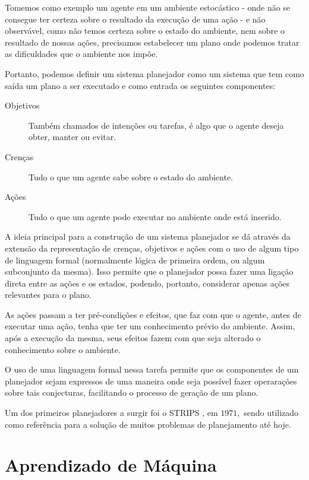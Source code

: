 Tomemos como exemplo um agente em um ambiente estocástico - onde não se consegue
ter certeza sobre o resultado da execução de uma ação - e não observável, como
não temos certeza sobre o estado do ambiente, nem sobre o resultado de nossas
ações, precisamos estabelecer um plano onde podemos tratar as dificuldades que
o ambiente nos impõe.

Portanto, podemos definir um sistema planejador como um sistema que tem como
saída um plano a ser executado e como entrada os seguintes componentes:

\begin{description}
    \item [Objetivos]
        Também chamados de intenções ou tarefas, é algo que o agente deseja
        obter, manter ou evitar.
    \item [Crenças]
        Tudo o que um agente sabe sobre o estado do ambiente.
    \item [Ações]
        Tudo o que um agente pode executar no ambiente onde está inserido.
\end{description}\cite{Woolridge:2001:IMS:559667}

A ideia principal para a construção de um sistema planejador se dá através da
extensão da representação de crenças, objetivos e ações com o uso de algum tipo
de linguagem formal (normalmente lógica de primeira ordem, ou algum subconjunto
da mesma). Isso permite que o planejador possa fazer uma ligação direta entre
as ações e os estados, podendo, portanto, considerar apenas ações relevantes
para o plano.
\cite{Russell:1995:AIM:193191}

As ações passam a ter pré-condições e efeitos, que faz com que o agente, antes
de executar uma ação, tenha que ter um conhecimento prévio do ambiente. Assim,
após a execução da mesma, seus efeitos fazem com que seja alterado o
conhecimento sobre o ambiente.

O uso de uma linguagem formal nessa tarefa permite que os componentes de um
planejador sejam expressos de uma maneira onde seja possível fazer operarações
sobre tais conjecturas, facilitando o processo de geração de um plano.

Um dos primeiros planejadores a surgir foi o STRIPS \cite{STRIPSNEWAPPROACH},
em $1971,$ sendo utilizado como referência para a solução de muitos problemas de
planejamento até hoje.

\section{Aprendizado de Máquina}

